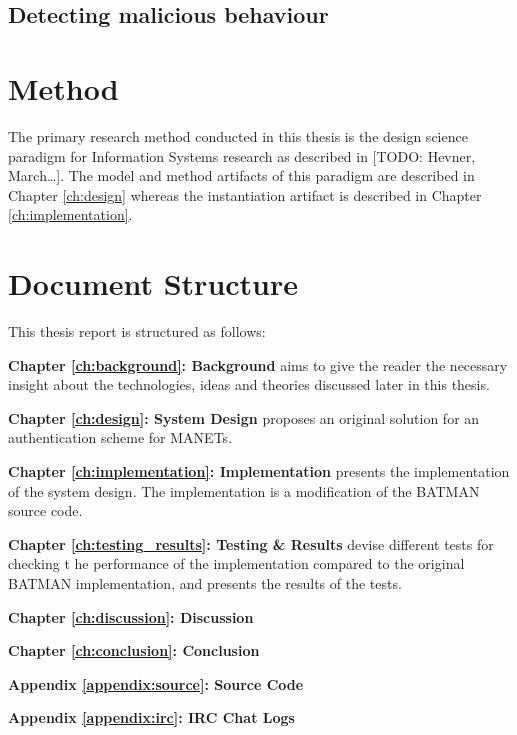 \subsection{Detecting malicious behaviour}
\label{limit:malicious_behaviour}


\section{Method}
The primary research method conducted in this thesis is the design science
paradigm for Information Systems research as described in [TODO: Hevner,
March\ldots]. The model and method artifacts of this paradigm are described in
Chapter \ref{ch:design} whereas the instantiation artifact is described in
Chapter \ref{ch:implementation}.

\section{Document Structure}
This thesis report is structured as follows:

\textbf{Chapter \ref{ch:background}: Background} aims to give the reader the
necessary insight about the technologies, ideas and theories discussed later in
this thesis.

\textbf{Chapter \ref{ch:design}: System Design} proposes an original solution
for an authentication scheme for \acp{MANET}.

\textbf{Chapter \ref{ch:implementation}: Implementation} presents the
implementation of the system design. The implementation is a modification of the
\ac{BATMAN} source code.

\textbf{Chapter \ref{ch:testing_results}: Testing \& Results} devise different
tests for checking t he performance of the implementation compared to the
original \ac{BATMAN} implementation, and presents the results of the tests.

\textbf{Chapter \ref{ch:discussion}: Discussion}

\textbf{Chapter \ref{ch:conclusion}: Conclusion}

\textbf{Appendix \ref{appendix:source}: Source Code}

\textbf{Appendix \ref{appendix:irc}: IRC Chat Logs}